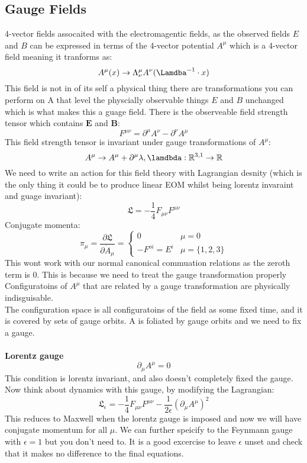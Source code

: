 \documentclass[12pt, a4paper, twoside, titlepage]{article}
\begin{document}
\begin{pmartix}
\subsection{Gauge Fields}
4-vector fields assocaited with the electromagentic fields, as the observed fields $E$ and $B$ can be expressed in terms of the 4-vector potential $A^{\mu}$ which is a 4-vector field meaning it tranforms as:
$$
A^{\mu}(x) \rightarrow \Lambda^{\mu}_{\nu} A^{\nu}(\Lamdba^{-1} \cdot x)
$$
This field is not in of its self a physical thing there are transformations you can perform on A that level the physcially observable things $E$ and $B$ unchanged which is what makes this a guage field. There is the observeable field strength tensor which contains $\bm E$ and $\bm B$:
$$
F^{\mu \nu} = \partial^{\mu} A^{\nu} - \partial^{\nu} A^{\mu}
$$
This field strength tensor is invariant under gauge transformations of $A^{\mu}$:
$$
A^{\mu} \rightarrow A^{\mu} + \partial^{\mu} \lambda, \lamdbda: \mathbb{R}^{3,1} \rightarrow \mathbb{R}
$$
We need to write an action for this field theory with Lagrangian desnity (which is the only thing it could be to produce linear EOM whilst being lorentz invaraint and guage invariant):
$$
\mathfrak{L} = -\frac{1}{4} F_{\mu \nu} F^{\mu \nu}
$$
Conjugate momenta:
$$
                                                                \pi_{\mu} = \frac{\partial \mathfrak{L}}{\partial \dot A_{\mu}} = \begin{cases} 0 & \mu  = 0\\ - F^{oi} = E^i & \mu = \{1,2,3\}\end{cases}
$$
This wont work with our normal canonical commuation relations as the zeroth term is 0. This is because we need to treat the gauge transformation properly\\
Configuratoins of $A^{\mu}$ that are related by a gauge transformation are physically indisguisable.\\
The configuration space is all configuratoins of the field as some fixed time, and it is covered by sets of gauge orbits. A is foliated by gauge orbits and we need to fix a gauge. \\\\
\textbf{Lorentz gauge}
$$
\partial_{\mu} A^{\mu} = 0
$$
This condition is lorentz invariant, and also doesn't completely fixed the gauge. Now think about dynamics with this gauge, by modifying the Lagrangian:
$$
\mathfrak{L}_{\epsilon} = -\frac{1}{4} F_{\mu \nu} F^{\mu \nu} - \frac{1}{2\epsilon} (\partial_{\mu} A^{\mu})^2
$$
This reduces to Maxwell when the lorentz gauge is imposed and now we will have conjugate momentum for all $\mu$. We can further speicify to the Feynmann gauge with $\epsilon = 1$ but you don't need to. It is a good excercise to leave $\epsilon$ unset and check that it makes no difference to the final equations.

\end{pmartix}
\end{document}
